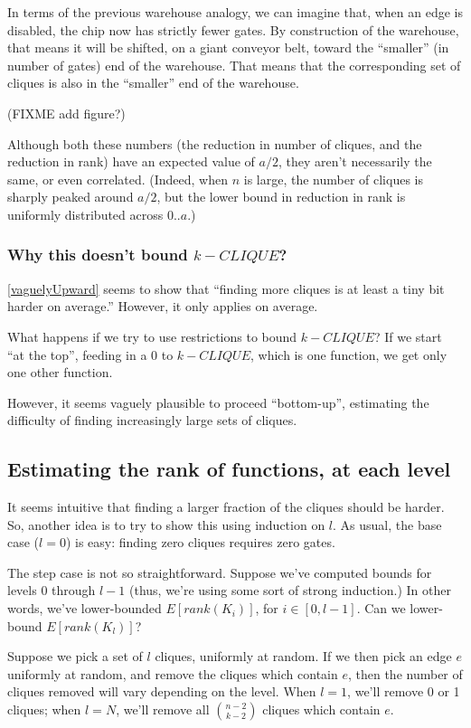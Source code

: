 \documentclass[12pt]{article}
\theoremstyle{definition}
\begin{document}
In terms of the previous warehouse analogy, we can imagine that,
when an edge is disabled, the chip now has strictly fewer gates.
By construction of the warehouse, that means it will be shifted,
on a giant conveyor belt,
toward the ``smaller'' (in number of gates) end of the warehouse.
That means that the corresponding set of cliques is also
in the ``smaller'' end of the warehouse.

(FIXME add figure?)

Although both these numbers (the reduction in number of cliques, and
the reduction in rank) have an expected value of $a/2$,
they aren't necessarily the same, or even correlated.
(Indeed, when $n$ is large, the number of cliques is sharply peaked around $a/2$,
but the lower bound in reduction in rank is uniformly distributed across $0..a$.)

\subsubsection{Why this doesn't bound $k-CLIQUE$?}

\ref{vaguelyUpward} seems to show that ``finding more cliques is
at least a tiny bit harder on average.'' However, it only applies
on average.

What happens if we try to use restrictions to bound $k-CLIQUE$?
If we start ``at the top'',
feeding in a 0 to $k-CLIQUE$, which is one function,
we get only one other function.

However, it seems vaguely plausible to proceed ``bottom-up'',
estimating the difficulty of finding increasingly large
sets of cliques.

\subsection{Estimating the rank of functions, at each level}

It seems intuitive that finding a larger fraction of the cliques
should be harder.
So, another idea is to try to show this using induction on $l$.
As usual, the base case ($l=0$) is easy: finding zero cliques requires zero gates.

The step case is not so straightforward. Suppose we've computed bounds for
levels 0 through $l-1$ (thus, we're using some sort of strong induction.)
In other words, we've lower-bounded $E[rank(K_i)]$, for $i \in [0,l-1]$.
Can we lower-bound $E[rank(K_l)]$?

Suppose we pick a set of $l$ cliques, uniformly at random.
If we then pick an edge $e$ uniformly at random, and remove the cliques
which contain $e$, then the number of cliques removed will vary
depending on the level. When $l=1$, we'll remove 0 or 1 cliques; when $l=N$,
we'll remove all ${n-2 \choose k-2}$ cliques which contain $e$.
\end{document}
